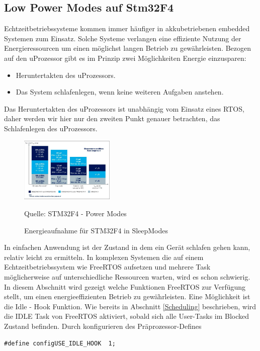 \documentclass[ngerman]{seminarvorlage}
\newcommand*{\quelle}{%
  \footnotesize Quelle: 
}
\begin{document}
\subsection{Low Power Modes auf Stm32F4}
\label{sec:Low Power Modes}
Echtzeitbetriebssysteme kommen immer häufiger in akkubetriebenen embedded Systemen zum Einsatz. Solche Systeme verlangen eine effiziente Nutzung der Energieressourcen um einen möglichst langen Betrieb zu gewährleisten. Bezogen auf den uProzessor gibt es im Prinzip zwei Möglichkeiten Energie einzusparen:
\begin{itemize}
	\item Heruntertakten des uProzessors.
	\item Das System schlafenlegen, wenn keine weiteren Aufgaben anstehen.
\end{itemize}
Das Heruntertakten des uProzessors ist unabhängig vom Einsatz eines RTOS, daher werden wir hier nur den zweiten Punkt genauer betrachten, das Schlafenlegen des uProzessors. 
\begin{figure}[htb!]
	\centering
		\includegraphics[width=0.4\textwidth]{Pictures/STM32F4/powerConsumption.png}
	\caption{Energieaufnahme für STM32F4 in SleepModes}
	\quelle{STM32F4 - Power Modes}
	\label{fig:AddressSpaceMMU}
\end{figure}   
In einfachen Anwendung ist der Zustand in dem ein Gerät schlafen gehen kann, relativ leicht zu ermitteln. In komplexen Systemen die auf einem Echtzeitbetriebssystem wie FreeRTOS aufsetzen und mehrere Task mög\-li\-cherweise auf unterschiedliche Ressourcen warten, wird es schon schwierig. In diesem Abschnitt wird gezeigt welche Funktionen FreeRTOS zur Verfügung stellt, um einen energieeffizienten Betrieb zu gewährleisten. Eine Möglichkeit ist die Idle - Hook Funktion. Wie bereits in Abschnitt \ref{Scheduling} beschrieben, wird die IDLE Task von FreeRTOS aktiviert, sobald sich alle User-Tasks im Blocked Zustand befinden. Durch konfigurieren des Präprozessor-Defines        
\begin{lstlisting}[label=lst:defineIdleHook, numbers = none]
#define configUSE_IDLE_HOOK  1; 
\end{lstlisting}
\end{document}
